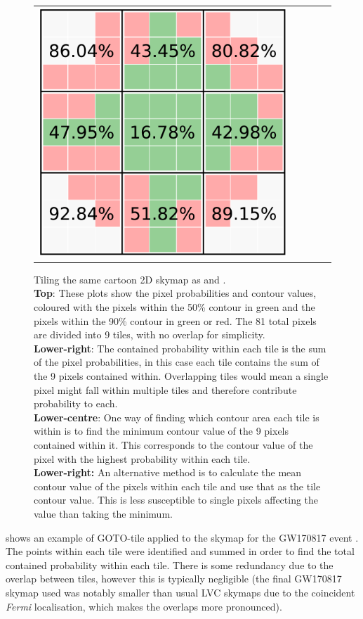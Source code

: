\begin{colsection}
\begin{colsection}
\begin{figure}[p]
\begin{center}
\begin{tabular}{cccccc}
\multicolumn{2}{c}{\includegraphics[width=0.3\linewidth]{images/sim/sim_skymap_tile_meanconts.pdf}}
\\
\end{tabular}
\end{center}

\caption[Calculating tile probabilities and contours for a 2D skymap]{Tiling the same cartoon 2D skymap as  and .\\
\textbf{Top}: These plots show the pixel probabilities and contour values, coloured with the pixels within the 50\% contour in green and the pixels within the 90\% contour in green or red. The 81 total pixels are divided into 9 tiles, with no overlap for simplicity.\\
\textbf{Lower-right}: The contained probability within each tile is the sum of the pixel probabilities, in this case each tile contains the sum of the 9 pixels contained within. Overlapping tiles would mean a single pixel might fall within multiple tiles and therefore contribute probability to each.\\
\textbf{Lower-centre}: One way of finding which contour area each tile is within is to find the minimum contour value of the 9 pixels contained within it. This corresponds to the contour value of the pixel with the highest probability within each tile.\\
\textbf{Lower-right:} An alternative method is to calculate the mean contour value of the pixels within each tile and use that as the tile contour value. This is less susceptible to single pixels affecting the value than taking the minimum.
}
\label{fig:sim_skymap_tiles}
\end{figure}


\clearpage

 shows an example of GOTO-tile applied to the skymap for the GW170817 event \citep{GW170817}. The points within each tile were identified and summed in order to find the total contained probability within each tile. There is some redundancy due to the overlap between tiles, however this is typically negligible (the final GW170817 skymap used was notably smaller than usual LVC skymaps due to the coincident \textit{Fermi} localisation, which makes the overlaps more pronounced).


\end{colsection}
\end{colsection}
